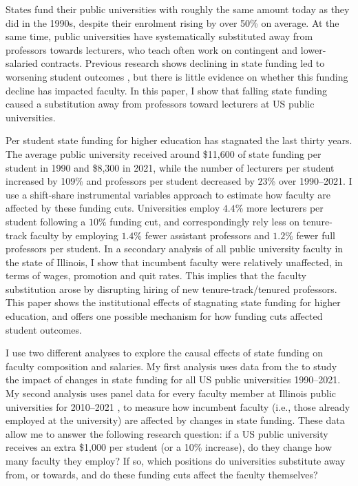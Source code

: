 States fund their public universities with roughly the same amount today as they did in the 1990s, despite their enrolment rising by over 50\% on average.
At the same time, public universities have systematically substituted away from professors towards lecturers, who teach often work on contingent and lower-salaried contracts.
Previous research shows declining in state funding led to worsening student outcomes \citep{NBERw23736,NBERw27885}, but there is little evidence on whether this funding decline has impacted faculty.
In this paper, I show that falling state funding caused a substitution away from professors toward lecturers at US public universities.

Per student state funding for higher education has stagnated the last thirty years.
The average public university received around \$11,600 of state funding per student in 1990 and \$8,300 in 2021, while the number of lecturers per student increased by 109\% and professors per student decreased by $23$\% over 1990--2021.
I use a shift-share instrumental variables approach to estimate how faculty are affected by these funding cuts.
Universities employ $4.4$\% more lecturers per student following a $10$\% funding cut, and correspondingly rely less on tenure-track faculty by employing $1.4$\% fewer assistant professors and $1.2$\% fewer full professors per student.
In a secondary analysis of all public university faculty in the state of Illinois, I show that incumbent faculty were relatively unaffected, in terms of wages, promotion and quit rates.
This implies that the faculty substitution arose by disrupting hiring of new tenure-track/tenured professors.
This paper shows the institutional effects of stagnating state funding for higher education, and offers one possible mechanism for how funding cuts affected student outcomes.

I use two different analyses to explore the causal effects of state funding on faculty composition and salaries.
My first analysis uses data from the \cite{ipeds} to study the impact of changes in state funding for all US public universities 1990--2021.
My second analysis uses panel data for every faculty member at Illinois public universities for 2010--2021 \citep{ibhed}, to measure how incumbent faculty (i.e., those already employed at the university) are affected by changes in state funding.
These data allow me to answer the following research question: if a US public university receives an extra \$1,000 per student (or a 10\% increase), do they change how many faculty they employ?
If so, which positions do universities substitute away from, or towards, and do these funding cuts affect the faculty themselves?


